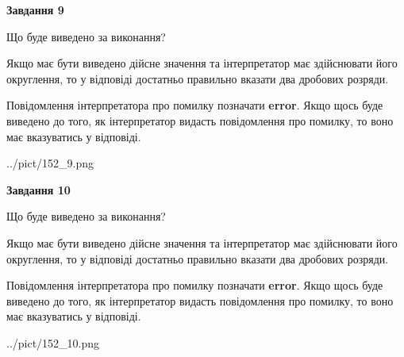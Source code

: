 \documentclass[12pt, ukrainian]{article}
\begin{document}
{\begin {Large}
{\begin {center}\textbf{Завдання 9}\end {center}}\par
Що буде виведено за виконання? \par

Якщо має бути виведено дійсне значення та інтерпретатор має здійснювати його округлення, 
то у відповіді достатньо правильно вказати два дробових розряди.

Повідомлення інтерпретатора про помилку позначати \textbf{error}.
Якщо щось буде виведено до того, як інтерпретатор видасть повідомлення про помилку, 
то воно має вказуватись у відповіді. \par

\begin{center}
	{../pict/152_9.png}
\end{center}
\newpage

{\begin {center}\textbf{Завдання 10}\end {center}}\par
Що буде виведено за виконання? \par

Якщо має бути виведено дійсне значення та інтерпретатор має здійснювати його округлення, 
то у відповіді достатньо правильно вказати два дробових розряди.

Повідомлення інтерпретатора про помилку позначати \textbf{error}.
Якщо щось буде виведено до того, як інтерпретатор видасть повідомлення про помилку, 
то воно має вказуватись у відповіді. \par

\begin{center}
	{../pict/152_10.png}
\end{center}
\newpage

\end {Large}}
\end{document}
